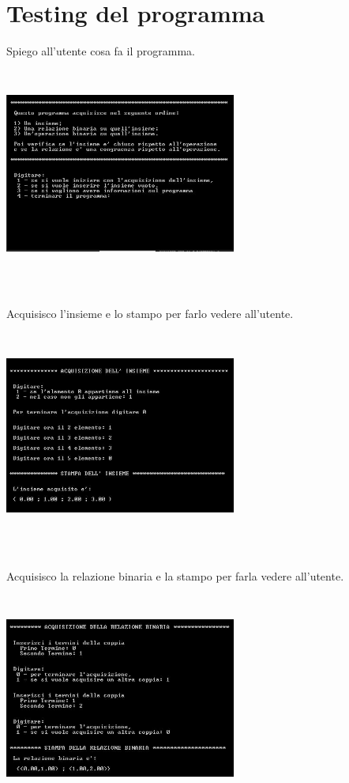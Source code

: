 ﻿\documentclass[11pt,a4paper,titlepage,block]{article}
\begin{document}
\section {Testing del programma}
Spiego all'utente cosa fa il programma.
\\
\includegraphics[width=3in,height=3in,viewport=0 0 300 300]{../Screenshots/Capture1.JPG}
\\
\\
Acquisisco l'insieme e lo stampo per farlo vedere all'utente.\\
\includegraphics[width=3in,height=3in,viewport=0 0 300 300]{../Screenshots/Capture2.JPG}\\
\\
\newpage
Acquisisco la relazione binaria e la stampo per farla vedere all'utente.\\
\includegraphics[width=3in,height=3in,viewport=0 0 300 300]{../Screenshots/Capture3.JPG}\\
\end{document}
